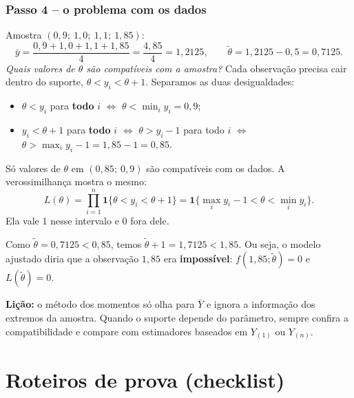\documentclass[11pt,a4paper]{article}
\theoremstyle{definition}
\theoremstyle{plain}
\newcommand{\ind}{\mathbf{1}}
\newcommand{\bY}{\bar{Y}}
\begin{document}
\subsubsection*{Passo 4 -- o problema com os dados}
Amostra $(0{,}9;\ 1{,}0;\ 1{,}1;\ 1{,}85)$:
\[
\bar y=\frac{0{,}9+1{,}0+1{,}1+1{,}85}{4}=\frac{4{,}85}{4}=1{,}2125,
\qquad
\tilde\theta=1{,}2125-0{,}5=0{,}7125 .
\]
\textit{Quais valores de $\theta$ são compatíveis com a amostra?} Cada observação precisa cair dentro do suporte, $\theta<y_i<\theta+1$. Separamos as duas desigualdades:
\begin{itemize}
\item $\theta<y_i$ para \textbf{todo} $i$ $\iff$ $\theta<\min_iy_i=0{,}9$;
\item $y_i<\theta+1$ para \textbf{todo} $i$ $\iff$ $\theta>y_i-1$ para todo $i$ $\iff$ $\theta>\max_iy_i-1=1{,}85-1=0{,}85$.
\end{itemize}
Só valores de $\theta$ em $(0{,}85;\ 0{,}9)$ são compatíveis com os dados. A verossimilhança mostra o mesmo:
\[
L(\theta)=\prod_{i=1}^n\ind\{\theta<y_i<\theta+1\}=\ind\{\max_iy_i-1<\theta<\min_iy_i\}.
\]
Ela vale 1 nesse intervalo e 0 fora dele.

Como $\tilde\theta=0{,}7125<0{,}85$, temos $\tilde\theta+1=1{,}7125<1{,}85$. Ou seja, o modelo ajustado diria que a observação $1{,}85$ era \textbf{impossível}: $f(1{,}85;\tilde\theta)=0$ e $L(\tilde\theta)=0$.

\textbf{Lição:} o método dos momentos só olha para $\bY$ e ignora a informação dos extremos da amostra. Quando o suporte depende do parâmetro, sempre confira a compatibilidade e compare com estimadores baseados em $Y_{(1)}$ ou $Y_{(n)}$.

\section{Roteiros de prova (checklist)}
\end{document}
